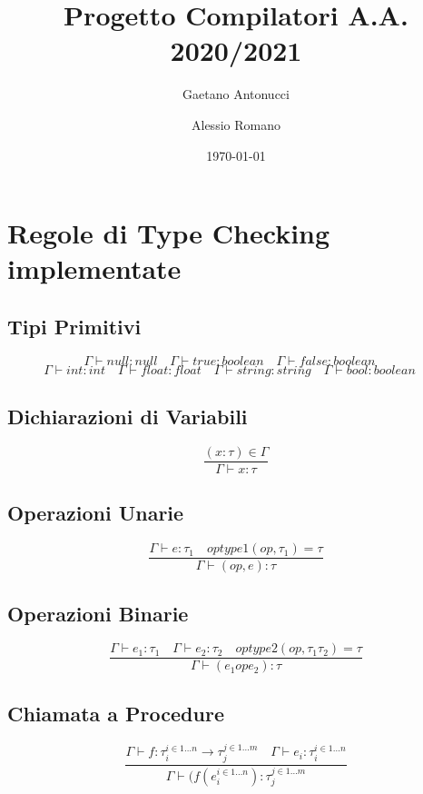 \documentclass[a4paper,12pt]{article}
\title{Progetto Compilatori A.A. 2020/2021}
\author{Gaetano Antonucci \and Alessio Romano}
\date{\today}
\begin{document}
    \maketitle
    \tableofcontents
    \section{Regole di Type Checking implementate}
    \subsection{Tipi Primitivi}
    \[
        \Gamma \vdash null \colon null \quad
        \Gamma \vdash true \colon boolean \quad
        \Gamma \vdash false \colon boolean \quad
    \]
    \[
        \Gamma \vdash \mathit{int} \colon int \quad
        \Gamma \vdash \mathit{float} \colon float \quad
        \Gamma \vdash \mathit{string} \colon string \quad
        \Gamma \vdash \mathit{bool}    \colon boolean \quad
    \]
    \subsection{Dichiarazioni di Variabili}
    \[
        \frac{(x \colon \tau) \in \Gamma}{\Gamma \vdash x \colon \tau}
    \]
    \subsection{Operazioni Unarie}
    \[
        \frac {\Gamma \vdash \mathit{e} \colon \tau_1 \quad optype1(op,\tau_1) = \tau} %
              {\Gamma \vdash (op,\mathit{e}) \colon \tau}
    \]
    \subsection{Operazioni Binarie}
    \[
        \frac {\Gamma \vdash \mathit{e_1} \colon \tau_1 \quad \Gamma \vdash \mathit{e_2} \colon \tau_2  \quad optype2(op,\tau_1 \tau_2) = \tau} %
        {\Gamma \vdash (\mathit{e_1} op \mathit{e_2}) \colon \tau}
    \]
    \subsection{Chiamata a Procedure}
    \[
        \frac {\Gamma \vdash \mathit{f} \colon \tau_i^{i \in 1 \dots n} \to \tau_j^{j \in 1 \dots m} \quad \Gamma \vdash \mathit{e_i} \colon \tau_i^{i \in 1 \dots n}} %
        {\Gamma \vdash (\mathit{f}(\mathit{e}_i^{i \in 1 \dots n})\colon \tau_j^{j \in 1 \dots m}}
    \]
\end{document}
